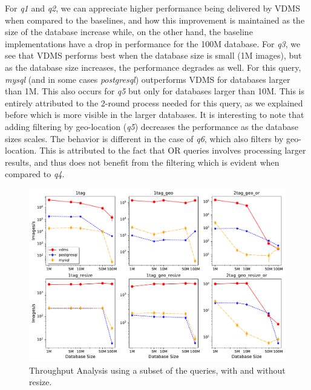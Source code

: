 For \textit{q1} and \textit{q2}, we can appreciate higher performance being delivered by
VDMS when compared to the baselines, and how this improvement is maintained
as the size of the database increase while,
on the other hand, the baseline implementations have a drop in performance
for the 100M database.
For \textit{q3}, we see that VDMS performs best when the database size
is small (1M images), but as the database size increases,
the performance degrades as well.
For this query, \textit{mysql} (and in some cases \textit{postgresql}) outperforms VDMS
for databases larger than 1M.
This also occurs for \textit{q5} but only for databases larger than 10M.
This is entirely attributed to the 2-round process needed for this query,
as we explained before which is more visible in the larger databases.
It is interesting to note that adding filtering by geo-location
(\textit{q5}) decreases the performance as the database sizes scales.
The behavior is different in the case of \textit{q6},
which also filters by geo-location.
This is attributed to the fact that OR queries involves processing
larger results, and thus does not benefit from the filtering
which is evident when compared to \textit{q4}.



\begin{figure}[h!]
\includegraphics[width=\columnwidth]{figures/plot_th_56_mosaic_results_throughput_resize}
\caption{Throughput Analysis using a subset of the queries, with and without resize.}
\label{fig:q_throughput_56_resize}
\end{figure}

